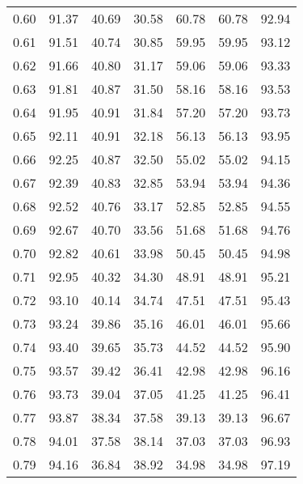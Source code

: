 \begin{tabular}{|c|c|c|c|c|c|c|}
      0.60 &     91.37 &     40.69 &      30.58 &   60.78 &      60.78 &         92.94 \\
      0.61 &     91.51 &     40.74 &      30.85 &   59.95 &      59.95 &         93.12 \\
      0.62 &     91.66 &     40.80 &      31.17 &   59.06 &      59.06 &         93.33 \\
      0.63 &     91.81 &     40.87 &      31.50 &   58.16 &      58.16 &         93.53 \\
      0.64 &     91.95 &     40.91 &      31.84 &   57.20 &      57.20 &         93.73 \\
      0.65 &     92.11 &     40.91 &      32.18 &   56.13 &      56.13 &         93.95 \\
      0.66 &     92.25 &     40.87 &      32.50 &   55.02 &      55.02 &         94.15 \\
      0.67 &     92.39 &     40.83 &      32.85 &   53.94 &      53.94 &         94.36 \\
      0.68 &     92.52 &     40.76 &      33.17 &   52.85 &      52.85 &         94.55 \\
      0.69 &     92.67 &     40.70 &      33.56 &   51.68 &      51.68 &         94.76 \\
      0.70 &     92.82 &     40.61 &      33.98 &   50.45 &      50.45 &         94.98 \\
      0.71 &     92.95 &     40.32 &      34.30 &   48.91 &      48.91 &         95.21 \\
      0.72 &     93.10 &     40.14 &      34.74 &   47.51 &      47.51 &         95.43 \\
      0.73 &     93.24 &     39.86 &      35.16 &   46.01 &      46.01 &         95.66 \\
      0.74 &     93.40 &     39.65 &      35.73 &   44.52 &      44.52 &         95.90 \\
      0.75 &     93.57 &     39.42 &      36.41 &   42.98 &      42.98 &         96.16 \\
      0.76 &     93.73 &     39.04 &      37.05 &   41.25 &      41.25 &         96.41 \\
      0.77 &     93.87 &     38.34 &      37.58 &   39.13 &      39.13 &         96.67 \\
      0.78 &     94.01 &     37.58 &      38.14 &   37.03 &      37.03 &         96.93 \\
      0.79 &     94.16 &     36.84 &      38.92 &   34.98 &      34.98 &         97.19 \\

\end{tabular}
